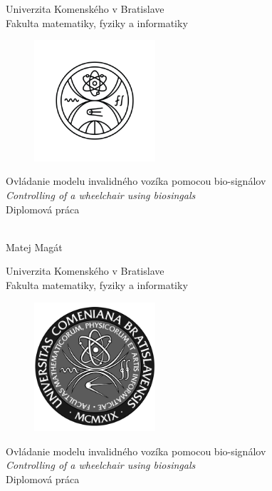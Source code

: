 \documentclass[12pt, twoside]{book}
\def\mfrok{2024}
\def\mfnazov{Ovládanie modelu invalidného vozíka pomocou bio-signálov \\
\textit{Controlling of a wheelchair using biosingals}}
\def\mftyp{Diplomová práca}
\def\mfautor{Matej Magát}
\begin{document}
     
\frontmatter


\thispagestyle{empty}

\begin{center}
\sc\large
Univerzita Komenského v Bratislave\\
Fakulta matematiky, fyziky a informatiky

\vfill

\begin{figure}[!hbt]
	\begin{center}
		\includegraphics[width=0.4\textwidth]{images/FMFI_logo_BP.png}
		\label{img:logo}
	\end{center}
\end{figure}
{\LARGE\mfnazov}\\
\mftyp
\end{center}

\vfill

{\sc\large 
\noindent \mfrok\\
\mfautor
}

\cleardoublepage


\thispagestyle{empty}
\noindent

\begin{center}
\sc  
\large
Univerzita Komenského v Bratislave\\
Fakulta matematiky, fyziky a informatiky

\vfill

\begin{figure}[!hbt]
	\begin{center}
		\includegraphics[width=0.4\textwidth]{images/logo_fmph_dark.png}
		\label{img:logo}
	\end{center}
\end{figure}
{\LARGE\mfnazov}\\
\mftyp
\end{center}
\end{document}
